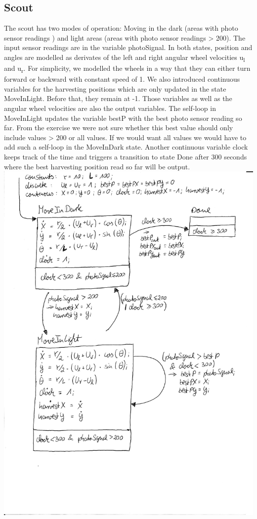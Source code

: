 \documentclass[12pt]{article}
\begin{document}
\subsection* {Scout}
The scout has two modes of operation: Moving in the dark (areas with photo sensor readings ) and light areas (areas with photo sensor readings > 200). The input sensor readings are in the variable photoSignal. In both states, position and angles are modelled as derivates of the left and right angular wheel velocities u\textsubscript{l} and u\textsubscript{r}. For simplicity, we modelled the wheels in a way that they can either turn forward or backward with constant speed of 1. We also introduced continuous variables for the harvesting positions which are only updated in the state MoveInLight. Before that, they remain at -1. Those variables as well as the angular wheel velocities are also the output variables. The self-loop in MoveInLight updates the variable bestP with the best photo sensor reading so far. From the exercise we were not sure whether this best value should only include values > 200 or all values. If we would want all values we would have to add such a self-loop in the MoveInDark state. Another continuous variable clock keeps track of the time and triggers a transition to state Done after 300 seconds where the best harvesting position read so far will be output.\\
\includegraphics[scale = 0.8]{pictures/hybrid_automata_scout}
\end{document}
